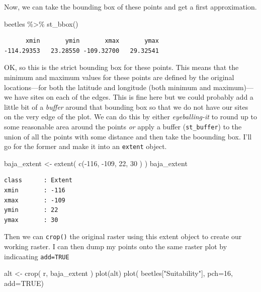 \documentclass[
  letterpaper,
]{book}
\newenvironment{Shaded}{\begin{snugshade}}{\end{snugshade}}
\newcommand{\AttributeTok}[1]{\textcolor[rgb]{0.40,0.45,0.13}{#1}}
\newcommand{\ConstantTok}[1]{\textcolor[rgb]{0.56,0.35,0.01}{#1}}
\newcommand{\DecValTok}[1]{\textcolor[rgb]{0.68,0.00,0.00}{#1}}
\newcommand{\FunctionTok}[1]{\textcolor[rgb]{0.28,0.35,0.67}{#1}}
\newcommand{\NormalTok}[1]{\textcolor[rgb]{0.00,0.23,0.31}{#1}}
\newcommand{\OtherTok}[1]{\textcolor[rgb]{0.00,0.23,0.31}{#1}}
\newcommand{\SpecialCharTok}[1]{\textcolor[rgb]{0.37,0.37,0.37}{#1}}
\newcommand{\StringTok}[1]{\textcolor[rgb]{0.13,0.47,0.30}{#1}}
\begin{document}
Now, we can take the bounding box of these points and get a first
approximation.

\begin{Shaded}
\begin{Highlighting}[]
\NormalTok{beetles }\SpecialCharTok{\%\textgreater{}\%} \FunctionTok{st\_bbox}\NormalTok{()}
\end{Highlighting}
\end{Shaded}

\begin{verbatim}
      xmin       ymin       xmax       ymax 
-114.29353   23.28550 -109.32700   29.32541 
\end{verbatim}

OK, so this is the strict bounding box for these points. This means that
the minimum and maximum values for these points are defined by the
original locations---for both the latitude and longitude (both minimum
and maximum)---we have sites on each of the edges. This is fine here but
we could probably add a little bit of a \emph{buffer} around that
bounding box so that we do not have our sites on the very edge of the
plot. We can do this by either \emph{eyeballing-it} to round up to some
reasonable area around the points \emph{or} apply a buffer
(\texttt{st\_buffer}) to the union of all the points with some distance
and then take the boounding box. I'll go for the former and make it into
an \texttt{extent} object.

\begin{Shaded}
\begin{Highlighting}[]
\NormalTok{baja\_extent }\OtherTok{\textless{}{-}} \FunctionTok{extent}\NormalTok{( }\FunctionTok{c}\NormalTok{(}\SpecialCharTok{{-}}\DecValTok{116}\NormalTok{, }\SpecialCharTok{{-}}\DecValTok{109}\NormalTok{, }\DecValTok{22}\NormalTok{, }\DecValTok{30}\NormalTok{ ) )}
\NormalTok{baja\_extent}
\end{Highlighting}
\end{Shaded}

\begin{verbatim}
class      : Extent 
xmin       : -116 
xmax       : -109 
ymin       : 22 
ymax       : 30 
\end{verbatim}

Then we can \texttt{crop()} the original raster using this extent object
to create our working raster. I can then dump my points onto the same
raster plot by indicaating \texttt{add=TRUE}

\begin{Shaded}
\begin{Highlighting}[]
\NormalTok{alt }\OtherTok{\textless{}{-}} \FunctionTok{crop}\NormalTok{( r, baja\_extent )}
\FunctionTok{plot}\NormalTok{(alt)}
\FunctionTok{plot}\NormalTok{( beetles[}\StringTok{"Suitability"}\NormalTok{], }\AttributeTok{pch=}\DecValTok{16}\NormalTok{, }\AttributeTok{add=}\ConstantTok{TRUE}\NormalTok{)}
\end{Highlighting}
\end{Shaded}
\end{document}
